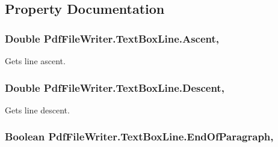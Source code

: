 \subsection{Property Documentation}
\subsubsection[{\texorpdfstring{Ascent}{Ascent}}]{\setlength{\rightskip}{0pt plus 5cm}Double Pdf\+File\+Writer.\+Text\+Box\+Line.\+Ascent\hspace{0.3cm}{\ttfamily [get]}, {\ttfamily [set]}}\hypertarget{class_pdf_file_writer_1_1_text_box_line_afd9f78cc965a804d90949cc6248a9ba6}{}\label{class_pdf_file_writer_1_1_text_box_line_afd9f78cc965a804d90949cc6248a9ba6}


Gets line ascent. 

\subsubsection[{\texorpdfstring{Descent}{Descent}}]{\setlength{\rightskip}{0pt plus 5cm}Double Pdf\+File\+Writer.\+Text\+Box\+Line.\+Descent\hspace{0.3cm}{\ttfamily [get]}, {\ttfamily [set]}}\hypertarget{class_pdf_file_writer_1_1_text_box_line_a7b602f1425dc69a770c29f0edb5ef32b}{}\label{class_pdf_file_writer_1_1_text_box_line_a7b602f1425dc69a770c29f0edb5ef32b}


Gets line descent. 

\subsubsection[{\texorpdfstring{End\+Of\+Paragraph}{EndOfParagraph}}]{\setlength{\rightskip}{0pt plus 5cm}Boolean Pdf\+File\+Writer.\+Text\+Box\+Line.\+End\+Of\+Paragraph\hspace{0.3cm}{\ttfamily [get]}, {\ttfamily [set]}}\hypertarget{class_pdf_file_writer_1_1_text_box_line_a55fe55c5e4e298c7a4bda8f8b12ace06}{}\label{class_pdf_file_writer_1_1_text_box_line_a55fe55c5e4e298c7a4bda8f8b12ace06}


